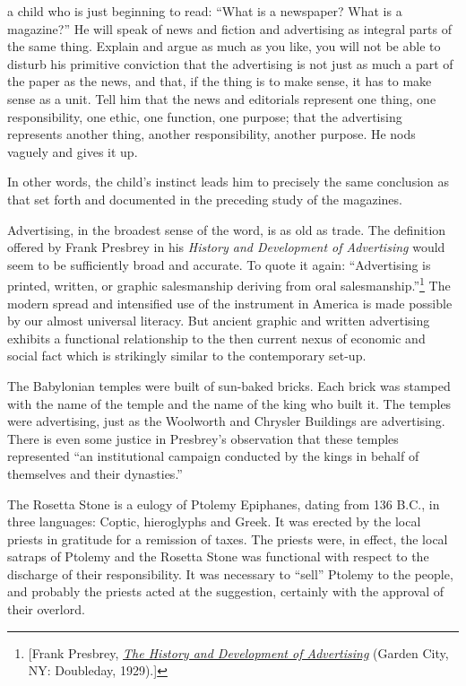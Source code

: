 \documentclass[openany,nobib]{tufte-book}
\begin{document}
  a child who is just beginning to read: ``What is a newspaper? What
is a magazine?'' He will speak of news and fiction and advertising as
integral parts of the same thing. Explain and argue as much as you like,
you will not be able to disturb his primitive conviction that the
advertising is not just as much a part of the paper as the news, and
that, if the thing is to make sense, it has to make sense as a unit.
Tell him that the news and editorials represent one thing, one
responsibility, one ethic, one function, one purpose; that the
advertising represents another thing, another responsibility, another
purpose. He nods vaguely and gives it up.

In other words, the child's instinct leads him to precisely the same
conclusion as that set forth and documented in the preceding study of
the magazines.

Advertising, in the broadest sense of the word, is as old as trade. The
definition offered by Frank Presbrey in his \emph{History and
Development of Advertising} would seem to be sufficiently broad and
accurate. To quote it again: ``Advertising is printed, written, or
graphic salesmanship deriving from oral salesmanship.''\footnote{{[}Frank Presbrey,
  \emph{\href{http://www.worldcat.org/oclc/700109}{The History and
  Development of Advertising}} (Garden City, NY: Doubleday, 1929).{]}} The modern
spread and intensified use of the instrument in America is made possible
by our almost universal literacy. But ancient graphic and written
advertising exhibits a functional relationship to the then current nexus
of economic and social fact which is strikingly similar to the
contemporary set-up.

The Babylonian temples were built of sun-baked bricks. Each brick was
stamped with the name of the temple and the name of the king who built
it. The temples were advertising, just as the Woolworth and Chrysler
Buildings are advertising. There is even some justice in Presbrey's
observation that these temples represented ``an institutional campaign
conducted by the kings in behalf of themselves and their dynasties.''

The Rosetta Stone is a eulogy of Ptolemy Epiphanes, dating from 136
B.C., in three languages: Coptic, hieroglyphs and Greek. It was erected
by the local priests in gratitude for a remission of taxes. The priests
were, in effect, the local satraps of Ptolemy and the Rosetta Stone was
functional with respect to the discharge of their responsibility. It was
necessary to ``sell'' Ptolemy to the people, and probably the priests
acted at the suggestion, certainly with the approval of their overlord.
\end{document}
